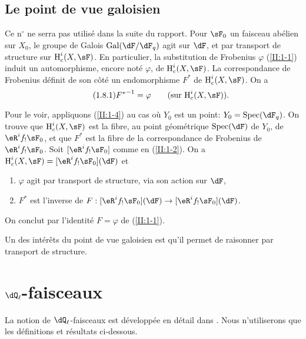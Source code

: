 \subsection{Le point de vue galoisien}\label{II:1-8}

Ce n$^\circ$ ne serra pas utilisé dans la suite du rapport. Pour $\sF_0$ un 
faisceau abélien sur $X_0$, le groupe de Galois $\gal(\dF/\dF_q)$ agit sur 
$\dF$, et par transport de structure sur $\h_c^i(X,\sF)$. En particulier, la 
substitution de Frobenius $\varphi$ (\ref{II:1-1}) induit un automorphisme, 
encore noté $\varphi$, de $\h_c^i(X,\sF)$. La correspondance de Frobenius 
définit de son côté un endomorphisme $F^*$ de $\h_c^i(X,\sF)$. On a 
\begin{equation*}\tag{1.8.1}\label{II:eq:1-8-1}
  {F^*}^{-1} = \varphi \qquad \text{(sur $\h_c^i(X,\sF)$).}
\end{equation*}

Pour le voir, appliquons (\ref{II:1-4}) au cas où $Y_0$ est un point: 
$Y_0=\spec(\dF_q)$. On trouve que $\h_c^i(X,\sF)$ est la fibre, au point 
géométrique $\spec(\dF)$ de $Y_0$, de $\eR^i f_! \sF_0$, et que $F^*$ est 
la fibre de la correspondance de Frobenius de $\eR^i f_!\sF_0$. Soit 
$[\eR^i f_! \sF_0]$ comme en (\ref{II:1-2}). On a 
$\h_c^i(X,\sF) = [\eR^i f_!\sF_0](\dF)$ et 
\begin{enumerate}[\indent a)]
  \item $\varphi$ agit par transport de structure, via son action sur $\dF$, 
  \item $F^*$ est l'inverse de 
    $F:[\eR^i f_!\sF_0](\dF) \to [\eR^i f_!\sF_0](\dF)$. 
\end{enumerate}

On conclut par l'identité $F=\varphi$ de (\ref{II:1-1}). 

Un des intérêts du point de vue galoisien est qu'il permet de raisonner par 
transport de structure. 










\section{\texorpdfstring{$\dQ_\ell$}{Ql}-faisceaux}\label{II:2}

La notion de $\dQ_\ell$-faisceaux est développée en détail dans 
\cite[V,VI]{sga5}. Nous n'utiliserons que les définitions et résultats 
ci-dessous. 





